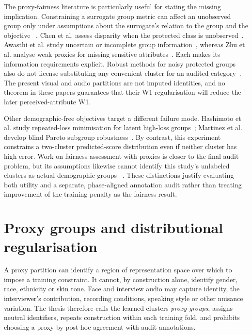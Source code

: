 The proxy-fairness literature is particularly useful for stating the missing implication.
Constraining a surrogate group metric can affect an unobserved group only under assumptions
about the surrogate's relation to the group and the objective
~\cite{Gupta2018ProxyFairness}. Chen et al. assess disparity when the protected class is
unobserved~\cite{Chen2019Unawareness}. Awasthi et al. study uncertain or incomplete group
information~\cite{Awasthi2021Uncertain}, whereas Zhu et al. analyse weak proxies for missing
sensitive attributes~\cite{Zhu2023WeakProxies}. Each makes its information requirements explicit.
Robust methods for noisy protected groups also do not license substituting any convenient
cluster for an audited category~\cite{Wang2020NoisyGroups}. The present visual and audio
partitions are not imputed identities, and no theorem in these papers guarantees that their
W1 regularisation will reduce the later perceived-attribute W1.

Other demographic-free objectives target a different failure mode. Hashimoto et al. study
repeated-loss minimisation for latent high-loss groups~\cite{Hashimoto2018}; Martinez et al.
develop blind Pareto subgroup robustness~\cite{Martinez2021}. By contrast, this experiment
constrains a two-cluster
predicted-score distribution even if neither cluster has high error. Work on fairness
assessment with proxies is closer to the final audit problem, but its assumptions likewise
cannot identify this study's unlabeled clusters as actual demographic groups
~\cite{Harvey2024Proxies}. These distinctions justify evaluating both utility and a separate,
phase-aligned annotation audit rather than treating improvement of the training penalty as the
fairness result.

\section{Proxy groups and distributional regularisation}

A proxy partition can identify a region of representation space over which to impose a training
constraint. It cannot, by construction alone, identify gender, race, ethnicity or skin tone.
Face and interview audio may capture identity, the interviewer's contribution, recording
conditions, speaking style or other nuisance
variation. The thesis therefore calls the learned clusters \emph{proxy groups}, assigns neutral
identifiers, repeats construction within each training fold, and prohibits choosing a proxy by
post-hoc agreement with audit annotations.

